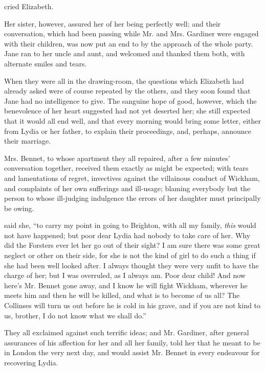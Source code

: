  cried Elizabeth. 

Her sister, however, assured her of her being perfectly well; and their conversation, which had been passing while Mr. and Mrs. Gardiner were engaged with their children, was now put an end to by the approach of the whole party. Jane ran to her uncle and aunt, and welcomed and thanked them both, with alternate smiles and tears.

When they were all in the drawing-room, the questions which Elizabeth had already asked were of course repeated by the others, and they soon found that Jane had no intelligence to give. The sanguine hope of good, however, which the benevolence of her heart suggested had not yet deserted her; she still expected that it would all end well, and that every morning would bring some letter, either from Lydia or her father, to explain their proceedings, and, perhaps, announce their marriage.

Mrs. Bennet, to whose apartment they all repaired, after a few minutes' conversation together, received them exactly as might be expected; with tears and lamentations of regret, invectives against the villainous conduct of Wickham, and complaints of her own sufferings and ill-usage; blaming everybody but the person to whose ill-judging indulgence the errors of her daughter must principally be owing.

 said she, “to carry my point in going to Brighton, with all my family, {\em this} would not have happened; but poor dear Lydia had nobody to take care of her. Why did the Forsters ever let her go out of their sight? I am sure there was some great neglect or other on their side, for she is not the kind of girl to do such a thing if she had been well looked after. I always thought they were very unfit to have the charge of her; but I was overruled, as I always am. Poor dear child! And now here's Mr. Bennet gone away, and I know he will fight Wickham, wherever he meets him and then he will be killed, and what is to become of us all? The Collinses will turn us out before he is cold in his grave, and if you are not kind to us, brother, I do not know what we shall do.”

They all exclaimed against such terrific ideas; and Mr. Gardiner, after general assurances of his affection for her and all her family, told her that he meant to be in London the very next day, and would assist Mr. Bennet in every endeavour for recovering Lydia.

